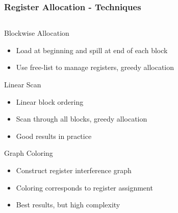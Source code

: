 \documentclass[navbaroff,en]{sdqbeamer}
\begin{document}
\begin{frame}
    \frametitle{Register Allocation - Techniques}

	\begin{columns}
		\begin{column}{0.65\textwidth}
		    \begin{contentblock}{Blockwise Allocation}
		    	\begin{itemize}
		    		\item Load at beginning and spill at end of each block
		    		\item Use free-list to manage registers, greedy allocation
		    	\end{itemize}
		    \end{contentblock}
	
			\begin{contentblock}{Linear Scan}
				\begin{itemize}
					\item Linear block ordering
					\item Scan through all blocks, greedy allocation
					\item Good results in practice
				\end{itemize}
			\end{contentblock}
	
			\begin{contentblock}{Graph Coloring}
				\begin{itemize}
					\item Construct register interference graph
					\item Coloring corresponds to register assignment
					\item Best results, but high complexity
				\end{itemize}
			\end{contentblock}
		\end{column}


\end{columns}
\end{frame}
\end{document}
